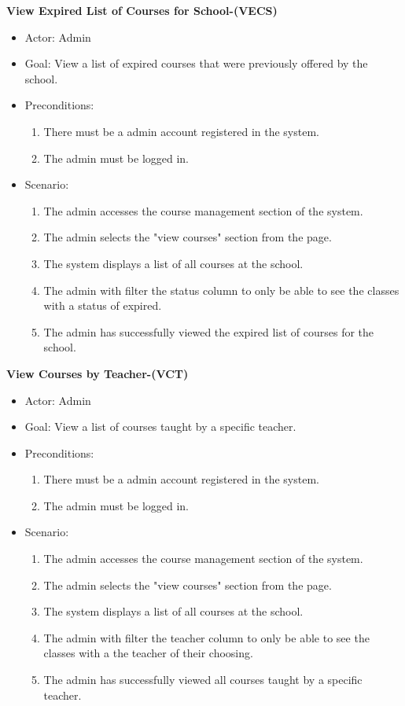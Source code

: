 \documentclass[letterpaper,12pt,oneside,listof=totoc]{scrreprt}
\begin{document}
\hfill \break
\textbf{View Expired List of Courses for School-(VECS)}
\begin{itemize}
    \item Actor: Admin
    \item Goal: View a list of expired courses that were previously offered by the school.
    \item Preconditions:
    \begin{enumerate}
        \item There must be a admin account registered in the system.
        \item The admin must be logged in.
    \end{enumerate}
    \item Scenario:
    \begin{enumerate}
        \item The admin accesses the course management section of the system.
        \item The admin selects the "view courses" section from the page. 
        \item The system displays a list of all courses at the school.
        \item The admin with filter the status column to only be able to see the classes with a status of expired.
        \item The admin has successfully viewed the expired list of courses for the school.
    \end{enumerate}
\end{itemize}

\hfill \break
\textbf{View Courses by Teacher-(VCT)}
\begin{itemize}
    \item Actor: Admin
    \item Goal: View a list of courses taught by a specific teacher.
    \item Preconditions:
    \begin{enumerate}
        \item There must be a admin account registered in the system.
        \item The admin must be logged in.
    \end{enumerate}
    \item Scenario:
    \begin{enumerate}
        \item The admin accesses the course management section of the system.
        \item The admin selects the "view courses" section from the page. 
        \item The system displays a list of all courses at the school.
        \item The admin with filter the teacher column to only be able to see the classes with a the teacher of their choosing.
        \item The admin has successfully viewed all courses taught by a specific teacher.
    \end{enumerate}
\end{itemize}
\end{document}
